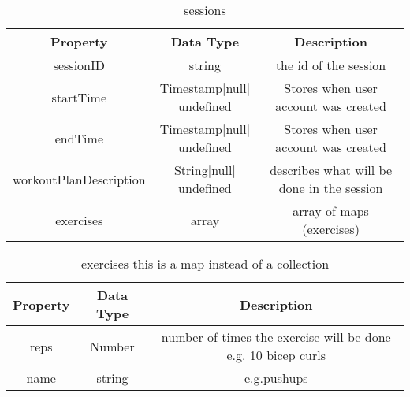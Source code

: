 \documentclass[12pt, letterpaper]{article}
\begin{document}
    \begin{table}[ht]
      \centering
      \caption{sessions}
      \begin{tabular}{||c c c||} 
        \hline
        Property & Data Type & Description\\ [0.1ex] 
        \hline\hline
        sessionID & string & the id of the session\\
        startTime & Timestamp$|$null$|$undefined & Stores when user account was created\\
        endTime & Timestamp$|$null$|$undefined & Stores when user account was created\\
        workoutPlanDescription & String$|$null$|$undefined & describes what will be done in the session\\
        exercises & array & array of maps (exercises)\\
        \hline
      \end{tabular}
      \label{table:data}
    \end{table}
    
    \begin{table}[ht]
      \centering
      \caption{exercises this is a map instead of a collection}
      \begin{tabular}{||c c c||} 
        \hline
        Property & Data Type & Description\\ [0.1ex] 
        \hline\hline
        reps & Number & number of times the exercise will be done e.g. 10 bicep curls\\
        name & string & e.g.pushups\\

        \hline
      \end{tabular}
      \label{table:data}
    \end{table}
    
\end{document}
